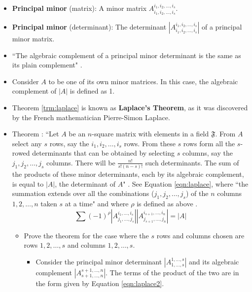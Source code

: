 \documentclass[titlepage]{article}
\newcounter{theorem}
\newcommand{\newtrm}[1]{\refstepcounter{theorem}\label{#1}Theorem \thetheorem: }
\numberwithin{figure}{section}
\numberwithin{equation}{section}
\numberwithin{theorem}{section}
\newcommand{\dq}[4][]{``#2"#1 \cite[#4]{#3}.}
\begin{document}
\begin{itemize}
    \item \textbf{Principal minor} (matrix): A minor matrix $A_{i_1,i_2,\dots,i_s}^{i_1,i_2,\dots,i_s}$.
    \item \textbf{Principal minor} (determinant): The determinant $\left|A_{i_1,i_2,\dots,i_s}^{i_1,i_2,\dots,i_s}\right|$ of a principal minor matrix.
    \item \dq{The algebraic complement of a principal minor determinant is the same as its plain complement}{bib:determinants}{22}
    \item Consider $A$ to be one of its own minor matrices. In this case, the algebraic complement of $|A|$ is defined as 1.
    \item Theorem \ref{trm:laplace} is known as \textbf{Laplace's Theorem}, as it was discovered by the French mathematician Pierre-Simon Laplace.
    \item \newtrm{trm:laplace}\dq{Let $A$ be an $n$-square matrix with elements in a field $\mathfrak{F}$. From $A$ select any $s$ rows, say the $i_1,i_2,\dots,i_s$ rows. From these $s$ rows form all the $s$-rowed determinants that can be obtained by selecting $s$ columns, say the $j_1,j_2,\dots,j_s$ columns. There will be $\frac{n!}{s!(n-s)!}$ such determinants. The sum of the products of these minor determinants, each by its algebraic complement, is equal to $|A|$, the determinant of $A$}{bib:determinants}{22} See Equation \ref{eqn:laplace}, where \dq[ and where $\rho$ is defined as above]{the summation extends over all the combinations ($j_1,j_2,\dots,j_s$) of the $n$ columns $1,2,\dots,n$ taken $s$ at a time}{bib:determinants}{22}
    \begin{equation}\label{eqn:laplace}
        \sum (-1)^\rho \left| A_{j_1,\dots,j_s}^{i_1,\dots,i_s} \right|\left|A_{j_{s+1},\dots,j_n}^{i_{s+1},\dots,i_n}\right| = |A|
    \end{equation}
    \begin{itemize}
        \item Prove the theorem for the case where the $s$ rows and columns chosen are rows $1,2,\dots,s$ and columns $1,2,\dots,s$.
        \begin{itemize}
            \item Consider the principal minor determinant $\left|A_{1,\dots,s}^{1,\dots,s}\right|$ and its algebraic complement $\left|A_{s+1,\dots,n}^{s+1,\dots,n}\right|$. The terms of the product of the two are in the form given by Equation \ref{eqn:laplace2}.
            \begin{equation}\label{eqn:laplace2}

\end{equation}
\end{itemize}
\end{itemize}
\end{itemize}
\end{document}

